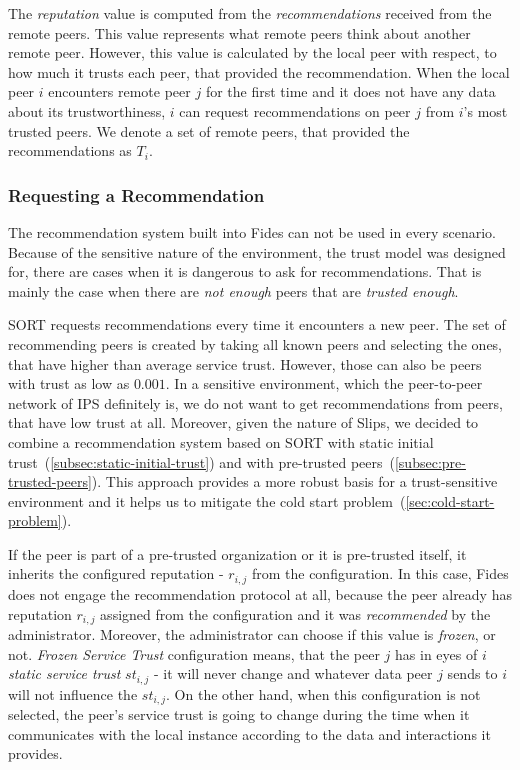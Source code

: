 The \textit{reputation} value is computed from the \textit{recommendations} received from the remote peers. This value represents what remote peers think about another remote peer. However, this value is calculated by the local peer with respect, to how much it trusts each peer, that provided the recommendation.
When the local peer $i$ encounters remote peer $j$ for the first time and it does not have any data about its trustworthiness, $i$ can request recommendations on peer $j$ from $i$'s most trusted peers.
We denote a set of remote peers, that provided the recommendations as $T_{i}$.

\subsubsection{Requesting a Recommendation}
\label{subsubsec:requesting-recommendation}
The recommendation system built into Fides can not be used in every scenario.
Because of the sensitive nature of the environment, the trust model was designed for, there are cases when it is dangerous to ask for recommendations.
That is mainly the case when there are \textit{not enough} peers that are \textit{trusted enough}.

SORT requests recommendations every time it encounters a new peer. The set of recommending peers is created by taking all known peers and selecting the ones, that have higher than average service trust.
However, those can also be peers with trust as low as $0.001$. In a sensitive environment, which the peer-to-peer network of IPS definitely is, we do not want to get recommendations from peers, that have low trust at all.
Moreover, given the nature of Slips, we decided to combine a recommendation system based on SORT with static initial trust~(\ref{subsec:static-initial-trust}) and with pre-trusted peers~(\ref{subsec:pre-trusted-peers}).
This approach provides a more robust basis for a trust-sensitive environment and it helps us to mitigate the cold start problem~(\ref{sec:cold-start-problem}).

If the peer is part of a pre-trusted organization or it is pre-trusted itself, it inherits the configured reputation - $r_{i, j}$ from the configuration.
In this case, Fides does not engage the recommendation protocol at all, because the peer already has reputation $r_{i,j}$ assigned from the configuration and it was \textit{recommended} by the administrator.
Moreover, the administrator can choose if this value is \textit{frozen}, or not. 
\textit{Frozen Service Trust} configuration means, that the peer $j$ has in eyes of $i$ \textit{static service trust} $st_{i, j}$ - it will never change and whatever data peer $j$ sends to $i$ will not influence the $st_{i,j}$.
On the other hand, when this configuration is not selected, the peer's service trust is going to change during the time when it communicates with the local instance according to the data and interactions it provides.

